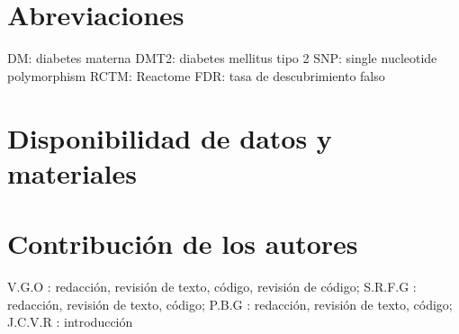 \documentclass{bmcart}
\begin{document}
	\begin{backmatter}
	
		\section*{Abreviaciones}%
		DM: diabetes materna
		DMT2: diabetes mellitus tipo 2
		SNP: single nucleotide polymorphism 
		RCTM: Reactome
		FDR: tasa de descubrimiento falso
		
		\section*{Disponibilidad de datos y materiales}%
		
		\section*{Contribución de los autores}
			V.G.O : redacción, revisión de texto, código, revisión de código; S.R.F.G : redacción, revisión de texto, código; P.B.G : redacción, revisión de texto, código; J.C.V.R : introducción
		
		
		
	
	\end{backmatter}
\end{document}
